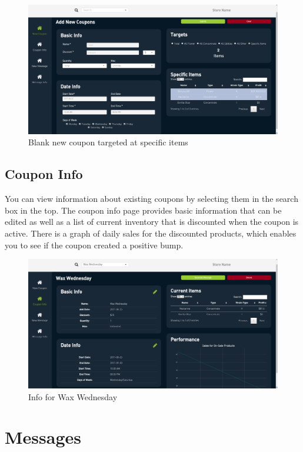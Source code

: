 \documentclass[]{book}
\theoremstyle{definition}
\theoremstyle{definition}
\theoremstyle{definition}
\theoremstyle{remark}
\begin{document}
\begin{figure}
\centering
\includegraphics{images/C3.png}
\caption{Blank new coupon targeted at specific items}
\end{figure}

\subsection{Coupon Info}\label{coupon-info}

You can view information about existing coupons by selecting them in the
search box in the top. The coupon info page provides basic information
that can be edited as well as a list of current inventory that is
discounted when the coupon is active. There is a graph of daily sales
for the discounted products, which enables you to see if the coupon
created a positive bump.

\begin{figure}
\centering
\includegraphics{images/C4.png}
\caption{Info for Wax Wednesday}
\end{figure}

\section{Messages}\label{messages}
\end{document}

